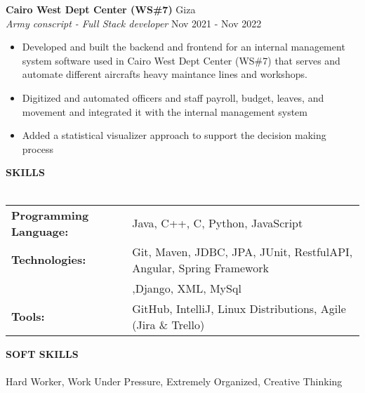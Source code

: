 \documentclass[a4paper]{article}
\newcommand{\lineunder} {
    \vspace*{-5pt} \\
    \hspace*{-18pt} \hrulefill \\
}
\newcommand{\header} [1] {
    {\hspace*{-18pt}\vspace*{6pt} \textsc{#1}}
    \vspace*{-6pt} \lineunder
}
\begin{document}
\textbf{Cairo West Dept Center (WS\#7)} \hfill Giza\\
\textit{Army conscript - Full Stack developer} \hfill Nov 2021 - Nov 2022\\
\vspace{-1mm}
\begin{itemize} \itemsep 1pt
	\item Developed and built the backend and frontend for an internal management system software used in Cairo West Dept Center (WS\#7) that serves and automate different aircrafts heavy maintance lines and workshops.
	\item Digitized and automated officers and staff payroll, budget, leaves, and movement and integrated it with the internal management system
	\item Added a statistical visualizer approach to support the decision making process
\end{itemize}
\vspace{5pt}
\vspace{5pt}
\header{\textbf{SKILLS}}
\vspace{5pt}
\begin{tabular}{ l l }
	\textbf{Programming Language:} & Java, C++, C, Python, JavaScript                                                         \\
	\textbf{Technologies:}         & Git, Maven, JDBC, JPA, JUnit, RestfulAPI, Angular, Spring Framework \\
                          &,Django, XML, MySql \\
	\textbf{Tools:}                & GitHub, IntelliJ, Linux Distributions, Agile (Jira \& Trello)                             \\
\end{tabular}
\vspace{10pt}

\header{\textbf{SOFT SKILLS}}
\vspace{15pt}
 Hard Worker, Work Under Pressure, Extremely Organized, Creative Thinking\\                                              
\vspace{5pt}
\vspace{5pt}
\end{document}
